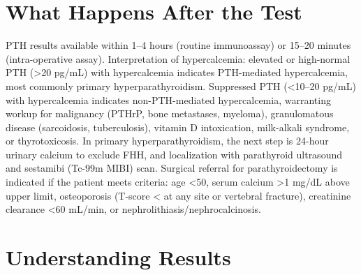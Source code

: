 \section*{What Happens After the Test}
PTH results available within 1--4 hours (routine immunoassay) or 15--20 minutes (intra-operative assay). Interpretation of hypercalcemia: elevated or high-normal PTH (>20 pg/mL) with hypercalcemia indicates PTH-mediated hypercalcemia, most commonly primary hyperparathyroidism. Suppressed PTH (<10--20 pg/mL) with hypercalcemia indicates non-PTH-mediated hypercalcemia, warranting workup for malignancy (PTHrP, bone metastases, myeloma), granulomatous disease (sarcoidosis, tuberculosis), vitamin D intoxication, milk-alkali syndrome, or thyrotoxicosis. In primary hyperparathyroidism, the next step is 24-hour urinary calcium to exclude FHH, and localization with parathyroid ultrasound and sestamibi (Tc-99m MIBI) scan. Surgical referral for parathyroidectomy is indicated if the patient meets criteria: age <50, serum calcium >1 mg/dL above upper limit, osteoporosis (T-score < at any site or vertebral fracture), creatinine clearance <60 mL/min, or nephrolithiasis/nephrocalcinosis.

\section*{Understanding Results}

